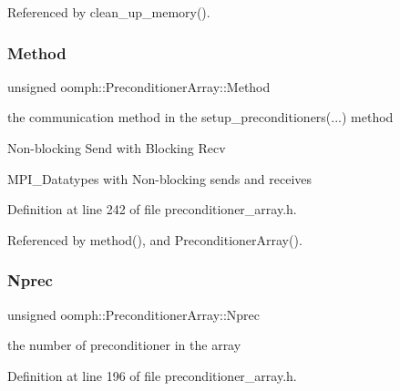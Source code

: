 Referenced by clean\+\_\+up\+\_\+memory().

\mbox{\label{classoomph_1_1PreconditionerArray_a28dd7675a57d1402e4b06c368ffa1e3b}} 
\subsubsection{\texorpdfstring{Method}{Method}}
{\footnotesize\ttfamily unsigned oomph\+::\+Preconditioner\+Array\+::\+Method\hspace{0.3cm}{\ttfamily [private]}}



the communication method in the setup\+\_\+preconditioners(...) method 


\begin{DoxyEnumerate}
\item Non-\/blocking Send with Blocking Recv
\item M\+P\+I\+\_\+\+Datatypes with Non-\/blocking sends and receives 
\end{DoxyEnumerate}

Definition at line 242 of file preconditioner\+\_\+array.\+h.



Referenced by method(), and Preconditioner\+Array().

\mbox{\label{classoomph_1_1PreconditionerArray_ab4f9ea783d3db44cf8401a0e0acc46dd}} 
\subsubsection{\texorpdfstring{Nprec}{Nprec}}
{\footnotesize\ttfamily unsigned oomph\+::\+Preconditioner\+Array\+::\+Nprec\hspace{0.3cm}{\ttfamily [private]}}



the number of preconditioner in the array 



Definition at line 196 of file preconditioner\+\_\+array.\+h.



